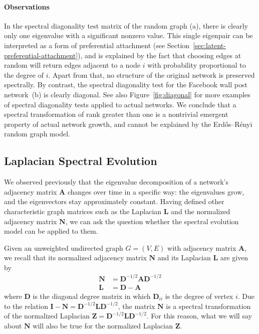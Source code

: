 \documentclass[11pt,a4paper]{book}
\begin{document}
\paragraph{Observations}
In the spectral diagonality test matrix of the random graph (a), there
is clearly only one 
eigenvalue with a significant nonzero value.  This
single eigenpair can be interpreted as a form of preferential
attachment (see Section~\ref{sec:latent-preferential-attachment}), and
is explained by the fact that 
choosing edges at random will return edges adjacent to a node $i$
with probability proportional to the degree of $i$.  Apart from that, no
structure of the original network is preserved spectrally.  
By contrast, the spectral diagonality test for the Facebook wall post
network~(b) is clearly diagonal. 
See also Figure~\ref{fig:diagonal} for more examples of spectral diagonality tests
applied to actual networks. 
We conclude that a spectral transformation of rank greater than one is a
nontrivial emergent property of actual network growth, and cannot be
explained by the Erdős--Rényi random graph model. 

\subsection{Laplacian Spectral Evolution}
\label{sec:laplacian-spectral-evolution}
We observed previously that the eigenvalue decomposition of a network's
adjacency matrix $\mathbf A$ changes over time in a specific way:  the eigenvalues
grow, and the eigenvectors stay approximately constant.  Having defined
other characteristic graph matrices such as the Laplacian $\mathbf L$
and the normalized adjacency matrix $\mathbf N$, we can ask the question
whether the spectral evolution model can be applied to them. 

Given an unweighted undirected graph $G=(V,E)$ with adjacency matrix
$\mathbf A$, we recall 
that its normalized adjacency matrix $\mathbf N$ and its Laplacian
$\mathbf L$ are given by
\begin{align*}
  \mathbf N &= \mathbf D^{-1/2} \mathbf A \mathbf D^{-1/2} \\
  \mathbf L &= \mathbf D - \mathbf A 
\end{align*}
where $\mathbf D$ is the diagonal degree matrix in which $\mathbf
D_{ii}$ is the degree of vertex $i$.  Due to the relation $\mathbf
I-\mathbf N = \mathbf D^{-1/2} \mathbf L \mathbf D^{-1/2}$, the matrix
$\mathbf N$ is a spectral transformation of the normalized Laplacian
$\mathbf Z = \mathbf D^{-1/2} \mathbf L \mathbf D^{-1/2}$.  For this
reason, what we will say about $\mathbf N$ will also be true for the
normalized Laplacian $\mathbf Z$.  
\end{document}
